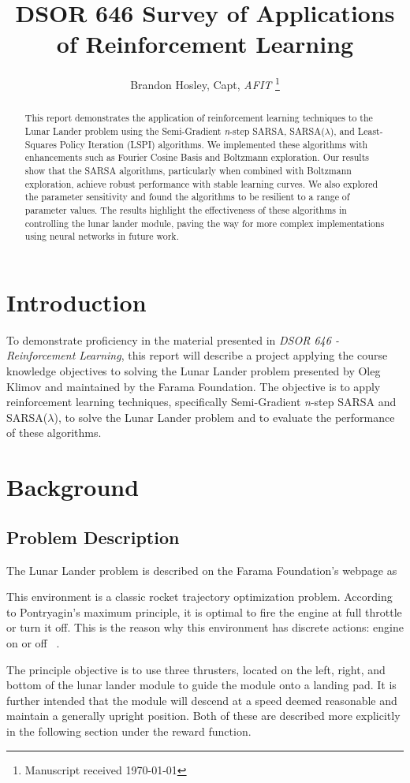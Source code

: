 \documentclass[journal]{IEEEtran}
\title{DSOR 646 Survey of Applications of Reinforcement Learning}
\author{Brandon Hosley, Capt, \textit{AFIT}%
    \thanks{Manuscript received \today%
}}
\begin{document}
\maketitle

\begin{abstract}
This report demonstrates the application of reinforcement learning techniques to the Lunar Lander 
problem using the Semi-Gradient \emph{n}-step SARSA, SARSA($\lambda$), and 
Least-Squares Policy Iteration (LSPI) algorithms. We implemented these algorithms with 
enhancements such as Fourier Cosine Basis and Boltzmann exploration. 
Our results show that the SARSA algorithms, particularly when combined with Boltzmann exploration,
achieve robust performance with stable learning curves. We also explored the parameter sensitivity 
and found the algorithms to be resilient to a range of parameter values. 
The results highlight the effectiveness of these algorithms in controlling the lunar lander module,
paving the way for more complex implementations using neural networks in future work.
\end{abstract}

\section{Introduction}
\label{sec:introduction}
To demonstrate proficiency in the material presented in \emph{DSOR 646 - Reinforcement Learning}, 
this report will describe a project applying the course knowledge objectives to solving the 
Lunar Lander problem presented by Oleg Klimov and maintained by the Farama Foundation. 
The objective is to apply reinforcement learning techniques, specifically 
Semi-Gradient \emph{n}-step SARSA and SARSA($\lambda$), to solve the Lunar Lander problem and 
to evaluate the performance of these algorithms.

\section{Background}

\subsection{Problem Description}

The Lunar Lander problem is described on the Farama Foundation's webpage as
\begin{displayquote}
    This environment is a classic rocket trajectory optimization problem. According to Pontryagin's 
    maximum principle, it is optimal to fire the engine at full throttle or turn it off. 
    This is the reason why this environment has discrete actions: engine on or off
    ~\cite{farama}.
\end{displayquote}
The principle objective is to use three thrusters, located on the left, right, and bottom of the
lunar lander module to guide the module onto a landing pad.
It is further intended that the module will descend at a speed deemed reasonable
and maintain a generally upright position.
Both of these are described more explicitly in the following section under the reward function.
\end{document}
